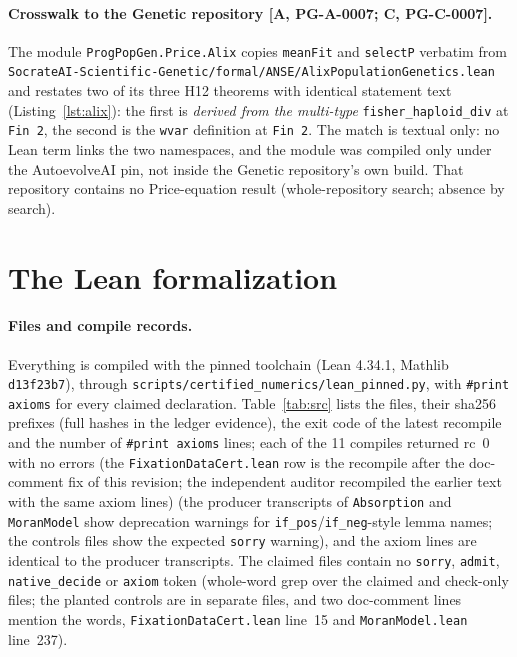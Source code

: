 \documentclass[11pt]{article}
\theoremstyle{remark}
\newcommand{\tier}[1]{\textsf{[#1]}}
\newcommand{\lean}[1]{\texttt{#1}}
\begin{document}



\paragraph{Crosswalk to the Genetic repository \tier{A, PG-A-0007; C, PG-C-0007}.} The module
\lean{ProgPopGen.Price.Alix} copies \lean{meanFit} and \lean{selectP} verbatim from
\texttt{SocrateAI-Scientific-Genetic/formal/ANSE/AlixPopulationGenetics.lean} and restates two of its three H12 theorems with
identical statement text (Listing~\ref{lst:alix}): the first is \emph{derived from the multi-type} \lean{fisher\_haploid\_div}
at \lean{Fin 2}, the second is the \lean{wvar} definition at \lean{Fin 2}. The match is textual only: no Lean term links the two namespaces, and the
module was compiled only under the AutoevolveAI pin, not inside the Genetic repository's own build. That repository contains no
Price-equation result (whole-repository search; absence by search).



\section{The Lean formalization}\label{sec:lean}
\paragraph{Files and compile records.} Everything is compiled with the pinned toolchain (Lean 4.34.1, Mathlib
\texttt{d13f23b7}), through \texttt{scripts/certified\_numerics/lean\_pinned.py}, with \lean{\#print axioms} for every claimed
declaration. Table~\ref{tab:src} lists the files, their sha256 prefixes (full hashes in the ledger evidence), the exit code of
the latest recompile and the number of \lean{\#print axioms} lines; each of the 11 compiles returned rc~0 with no errors (the \lean{FixationDataCert.lean} row is the recompile after the doc-comment fix of this revision; the independent auditor recompiled the earlier text with the same axiom lines) (the producer transcripts of \texttt{Absorption} and \texttt{MoranModel} show
deprecation warnings for \lean{if\_pos}/\lean{if\_neg}-style lemma names; the controls files show the expected \lean{sorry} warning), and the
axiom lines are identical to the producer transcripts. The claimed files contain no \lean{sorry}, \lean{admit}, \lean{native\_decide} or \lean{axiom}
token (whole-word grep over the claimed and check-only files; the planted controls are in separate files, and two doc-comment lines mention the words, \texttt{FixationDataCert.lean} line~15 and \texttt{MoranModel.lean} line~237).
\end{document}

